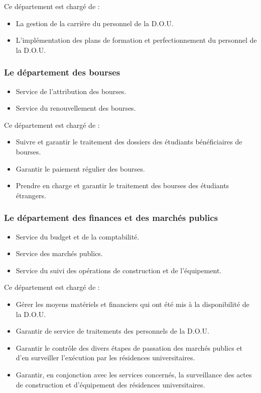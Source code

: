 Ce département est chargé de :
\begin{itemize}\renewcommand{\labelitemi}{$\bullet$}
    \item La gestion de la carrière du personnel de la \acs{D.O.U}.
    \item L'implémentation des plans de formation et perfectionnement du personnel de la \acs{D.O.U}.
\end{itemize}

\subsubsection{Le département des bourses}
\begin{itemize}
    \item Service de l'attribution des bourses.
    \item Service du renouvellement des bourses.\\
\end{itemize}

Ce département est chargé de :
\begin{itemize}\renewcommand{\labelitemi}{$\bullet$}
    \item Suivre et garantir le traitement des dossiers des étudiants bénéficiaires de bourses.
    \item Garantir le paiement régulier des bourses.
    \item Prendre en charge et garantir le traitement des bourses des étudiants étrangers.
\end{itemize}

\subsubsection{Le département des finances et des marchés publics}
\begin{itemize}
    \item Service du budget et de la comptabilité.
    \item Service des marchés publics.
    \item Service du suivi des opérations de construction et de l'équipement.\\
\end{itemize}

Ce département est chargé de :
\begin{itemize}\renewcommand{\labelitemi}{$\bullet$}
    \item Gérer les moyens matériels et financiers qui ont été mis à la disponibilité de la \acs{D.O.U}.
    \item Garantir de service de traitements des personnels de la \acs{D.O.U}.
    \item Garantir le contrôle des divers étapes de passation des marchés publics et d'en surveiller l'exécution par les résidences universitaires.
    \item Garantir, en conjonction avec les services concernés, la surveillance des actes de construction et d'équipement des résidences universitaires.\\
\end{itemize}

